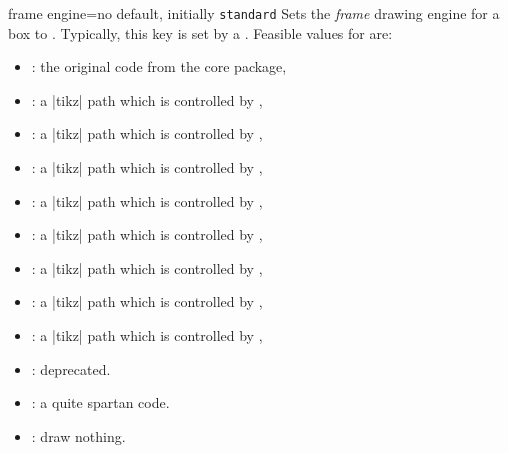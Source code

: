 
\begin{docTcbKey}{frame engine}{=}{no default, initially \texttt{standard}}
  Sets the \emph{frame} drawing engine for a box to .
  Typically, this key is set by a .
  Feasible values for  are:
  \begin{itemize}
  \item{}: the original code from the core package,
  \item{}: a |tikz| path which is controlled by ,
  \item{}: a |tikz| path which is controlled by ,
  \item{}: a |tikz| path which is controlled by ,
  \item{}: a |tikz| path which is controlled by ,
  \item{}: a |tikz| path which is controlled by ,
  \item{}: a |tikz| path which is controlled by ,
  \item{}: a |tikz| path which is controlled by ,
  \item{}: a |tikz| path which is controlled by ,
  \item{}: deprecated.
  \item{}: a quite spartan code.
  \item{}: draw nothing.
\end{itemize}
\end{docTcbKey}

